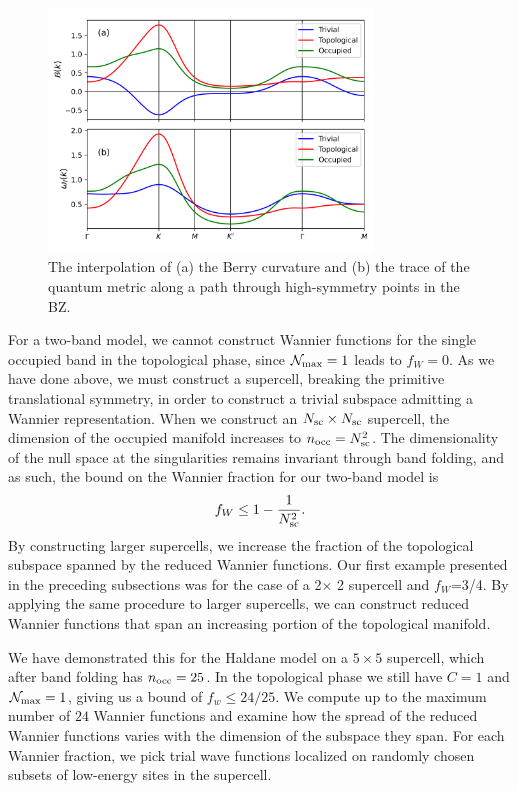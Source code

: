 \documentclass[galley,aps,pra,10pt,amsmath,amssymb,
    superscriptaddress,nofootinbib,longbibliography]{revtex4-2}
\begin{document}
\begin{figure}[t!]
\begin{center}
\includegraphics[width=3.4in]{fig7.png}
\end{center}
\vspace{-10mm}
\caption{The interpolation of (a) the Berry curvature and (b) the trace of the quantum metric along a path through high-symmetry points in the BZ. }
\label{FIG7}
\end{figure}

For a two-band model, we cannot construct Wannier functions for the single occupied band in the topological phase, since $\mathcal{N}_{\rm max} = 1$ leads to $f_W =0$. As we have done above, we must construct a supercell, breaking the primitive translational symmetry, in order to construct a trivial subspace admitting a Wannier representation. When we construct an $N_{\rm sc}\times N_{\rm sc}$ supercell, the dimension of the occupied manifold increases to $n_{\rm occ} = N_{\rm sc}^2$. The dimensionality of the null space at the singularities remains invariant through band folding, and as such, the bound on the Wannier fraction for our two-band model is
\begin{equation}
   f_W \leq 1 - \frac{1}{N_{\rm sc}^2}.
\end{equation}
By constructing larger supercells, we increase the fraction of the topological subspace spanned by the reduced Wannier functions. Our first example presented in the preceding subsections was for the case of a 2$\times$ 2 supercell and $f_W$=3/4. By applying the same procedure to larger supercells, we can construct reduced Wannier functions that span an increasing portion of the topological manifold. 


We have demonstrated this for the Haldane model on a $5\times 5$ supercell, which after band folding has $n_{\rm occ} =25$. In the topological phase we still have $C=1$ and $\mathcal{N}_{\rm max} = 1$, giving us a bound of $f_w \leq 24/25$. We compute up to the maximum number of $24$ Wannier functions and examine how the spread of the reduced Wannier functions varies with the dimension of the subspace they span. For each Wannier fraction, we pick trial wave functions localized on randomly chosen subsets of low-energy sites in the supercell. 
\end{document}
